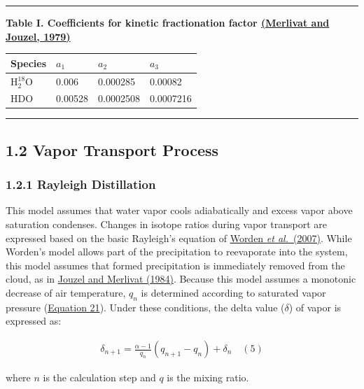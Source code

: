 \documentclass[11pt]{article}
\begin{document}
\begin{center}\rule{0.5\linewidth}{0.5pt}\end{center}

\textbf{Table I. Coefficients for kinetic fractionation factor \hyperref[merlivat1979]{(Merlivat and
Jouzel, 1979)}}

\begin{longtable}[]{@{}llll@{}}
\toprule\noalign{}
Species & \(a_1\) & \(a_2\) & \(a_3\) \\
\midrule\noalign{}
\endhead
\bottomrule\noalign{}
\endlastfoot
H\(_2^{18}\)O & 0.006 & 0.000285 & 0.00082 \\
HDO & 0.00528 & 0.0002508 & 0.0007216 \\
\end{longtable}

\begin{center}\rule{0.5\linewidth}{0.5pt}\end{center}

\subsection{1.2 Vapor Transport Process}\label{vapor-transport-process}

\subsubsection{1.2.1 Rayleigh Distillation}\label{rayleigh-distillation}

This model assumes that water vapor cools adiabatically and excess vapor above saturation condenses.
Changes in isotope ratios during vapor transport are expressed based on the basic Rayleigh's
equation of \hyperref[worden2007]{Worden \emph{et al.}~(2007)}. While Worden's model allows part of
the precipitation to reevaporate into the system, this model assumes that formed precipitation is
immediately removed from the cloud, as in \hyperref[jouzel1984]{Jouzel and Merlivat (1984)}. Because
this model assumes a monotonic decrease of air temperature, \(q_{n}\) is determined according to
saturated vapor pressure (\hyperref[eq21]{Equation 21}). Under these conditions, the delta value
(\(\delta\)) of vapor is expressed as:

\[
\begin{array}{r}
\delta_{n + 1} = \frac{\alpha - 1}{q_{n}}\left( q_{n + 1} - q_{n} \right) + \delta_{n} \quad (5)
\end{array}
\]

where \(n\) is the calculation step and \(q\) is the mixing ratio.
\end{document}
